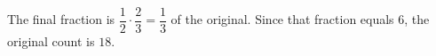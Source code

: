 The final fraction is $\dfrac{1}{2}\cdot\dfrac{2}{3}=\dfrac{1}{3}$ of the original. Since that fraction equals 6, the original count is $\boxed{18}$.
